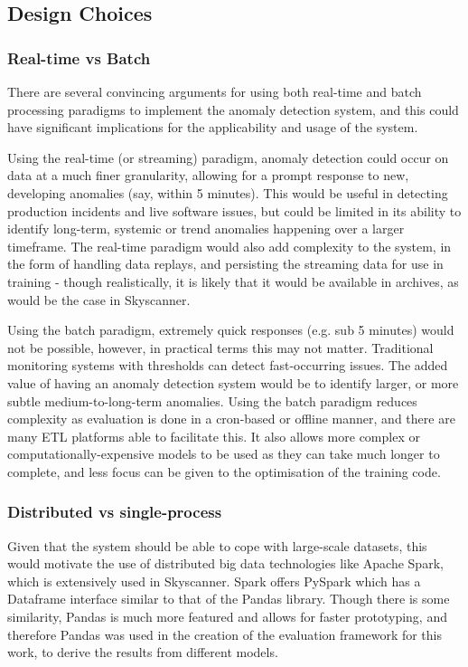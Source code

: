 \documentclass{mpaper}
\begin{document}
\subsection{Design Choices}

\subsubsection{Real-time vs Batch}
\label{section:streaming-vs-batch}

There are several convincing arguments for using both real-time and batch processing paradigms to implement the anomaly detection system, and this could have significant implications for the applicability and usage of the system.

Using the real-time (or streaming) paradigm, anomaly detection could occur on data at a much finer granularity, allowing for a prompt response to new, developing anomalies (say, within 5 minutes). This would be useful in detecting production incidents and live software issues, but could be limited in its ability to identify long-term, systemic or trend anomalies happening over a larger timeframe. The real-time paradigm would also add complexity to the system, in the form of handling data replays, and persisting the streaming data for use in training - though realistically, it is likely that it would be available in archives, as would be the case in Skyscanner.

Using the batch paradigm, extremely quick responses (e.g. sub 5 minutes) would not be possible, however, in practical terms this may not matter. Traditional monitoring systems with thresholds can detect fast-occurring issues. The added value of having an anomaly detection system would be to identify larger, or more subtle medium-to-long-term anomalies. Using the batch paradigm reduces complexity as evaluation is done in a cron-based or offline manner, and there are many ETL platforms able to facilitate this. It also allows more complex or computationally-expensive models to be used as they can take much longer to complete, and less focus can be given to the optimisation of the training code.

\subsubsection{Distributed vs single-process}
\label{section:distributed-vs-single-process}

Given that the system should be able to cope with large-scale datasets, this would motivate the use of distributed big data technologies like Apache Spark, which is extensively used in Skyscanner. Spark offers PySpark which has a Dataframe interface similar to that of the Pandas library. Though there is some similarity, Pandas is much more featured and allows for faster prototyping, and therefore Pandas was used in the creation of the evaluation framework for this work, to derive the results from different models.
\end{document}
